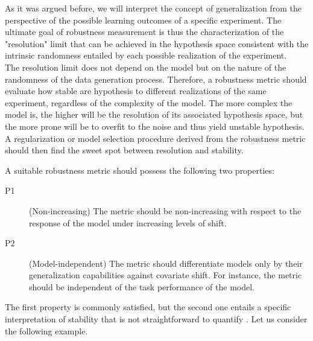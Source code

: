 As it was argued before, we will 
interpret the concept of generalization from the 
perspective of the possible learning outcomes
of a specific experiment. The ultimate goal 
of robustness measurement is thus the characterization of the "resolution" 
limit that can be achieved in the hypothesis space 
consistent with the intrinsic randomness entailed by each 
possible realization of the experiment. \\

The resolution limit does not depend on the model but on the 
nature of the randomness of the data generation process. 
Therefore, a robustness metric should evaluate how stable are hypothesis 
to different realizations of the same experiment, regardless 
of the complexity of the model. The more 
complex the model is, the higher will be the resolution of its
associated hypothesis space, but the more prone will be to overfit
to the noise and thus yield unstable hypothesis. A regularization 
or model selection procedure derived from the robustness metric 
should then find the sweet spot between resolution and stability. \\

\begin{properties}\label{properties:robustness}
    A suitable robustness metric should possess the following two properties:
\begin{description}
    \item[P1](Non-increasing) The metric should be non-increasing with respect to the
    response of the model under increasing levels of shift.
    \item[P2](Model-independent) The metric should differentiate models only by their generalization capabilities against 
    covariate shift. For instance, the metric should be independent of the task
    performance of the model.
\end{description}
\end{properties}

The first property is commonly satisfied, but the second one entails
a specific interpretation of stability that is not straightforward to
quantify \cite{buhmannPosteriorAgreementModel2022}. Let us consider
the following example.

